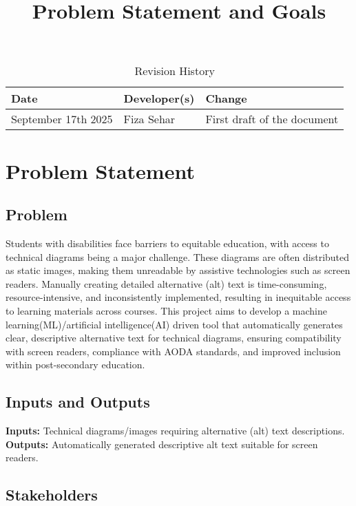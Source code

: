 \documentclass{article}
\title{Problem Statement and Goals\\\progname}
\author{\authname}
\date{}
\begin{document}
\maketitle

\begin{table}[hp]
\caption{Revision History} \label{TblRevisionHistory}
\begin{tabularx}{\textwidth}{llX}
\toprule
\textbf{Date} & \textbf{Developer(s)} & \textbf{Change}\\
\midrule
September 17th 2025 & Fiza Sehar & First draft of the document\\
\bottomrule
\end{tabularx}
\end{table}

\section{Problem Statement}

\subsection{Problem}
Students with disabilities face barriers to equitable education, with access to technical diagrams being a major challenge. These diagrams are often distributed as static images, making them unreadable by assistive technologies such as screen readers. Manually creating detailed alternative (alt) text is time-consuming, resource-intensive, and inconsistently implemented, resulting in inequitable access to learning materials across courses. This project aims to develop a machine learning(ML)/artificial intelligence(AI) driven tool that automatically generates clear, descriptive alternative text for technical diagrams, ensuring compatibility with screen readers, compliance with AODA standards, and improved inclusion within post-secondary education.

\subsection{Inputs and Outputs}
\textbf{Inputs:} Technical diagrams/images requiring alternative (alt) text descriptions.\\
\textbf{Outputs:} Automatically generated descriptive alt text suitable for screen readers.
\subsection{Stakeholders}
\end{document}
